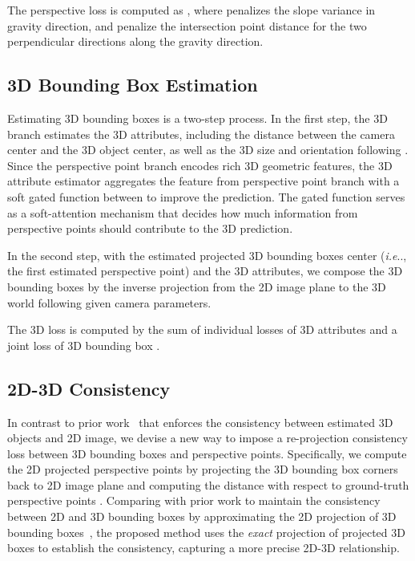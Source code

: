\documentclass{article}
\makeatletter
\DeclareRobustCommand\onedot{\futurelet\@let@token\@onedot}
\def\@onedot{\ifx\@let@token.\else.\null\fi\xspace}
\def\ie{\emph{i.e}\onedot} \def\Ie{\emph{I.e}\onedot}
\makeatother
\begin{document}
The perspective loss is computed as , where  penalizes the slope variance in gravity direction,  and  penalize the intersection point distance for the two perpendicular directions along the gravity direction.

\subsection{3D Bounding Box Estimation}
\label{sec:3dbox}

Estimating 3D bounding boxes is a two-step process. In the first step, the 3D branch estimates the 3D attributes, including the distance between the camera center and the 3D object center, as well as the 3D size and orientation following \citet{huang2018cooperative}. Since the perspective point branch encodes rich 3D geometric features, the 3D attribute estimator aggregates the feature from perspective point branch with a soft gated function between  to improve the prediction. The gated function serves as a soft-attention mechanism that decides how much information from perspective points should contribute to the 3D prediction.

In the second step, with the estimated projected 3D bounding boxes center (\ie, the first estimated perspective point) and the 3D attributes, we compose the 3D bounding boxes by the inverse projection from the 2D image plane to the 3D world following \citet{huang2018cooperative} given camera parameters.

The 3D loss is computed by the sum of individual losses of 3D attributes and a joint loss of 3D bounding box .


\subsection{2D-3D Consistency}
\label{sec:consistency}

In contrast to prior work~\cite{wu2016single,rezende2016unsupervised,yan2016perspective,mousavian20173d,wu2017marrnet,huang2018cooperative} that enforces the consistency between estimated 3D objects and 2D image, we devise a new way to impose a re-projection consistency loss between 3D bounding boxes and perspective points. Specifically, we compute the 2D projected perspective points  by projecting the 3D bounding box corners back to 2D image plane and computing the distance with respect to ground-truth perspective points . Comparing with prior work to maintain the consistency between 2D and 3D bounding boxes by approximating the 2D projection of 3D bounding boxes~\cite{mousavian20173d,huang2018cooperative}, the proposed method uses the \emph{exact} projection of projected 3D boxes to establish the consistency, capturing a more precise 2D-3D relationship.
\end{document}

